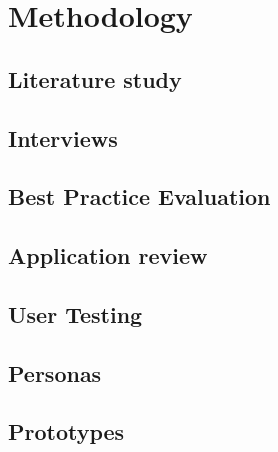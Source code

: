 \chapter{Methodology}
\label{chap:methodology}

\section{Literature study}
%
\section{Interviews}
%
\section{Best Practice Evaluation}
%
\section{Application review}
%
\section{User Testing}
%
\section{Personas}
%
\section{Prototypes}
